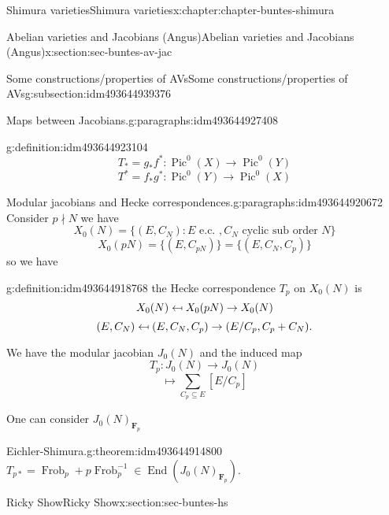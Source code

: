 \documentclass[oneside,10pt,]{book}
\numberwithin{equation}{section}
\newcommand{\inv}{^{-1}}
\providecommand\mapsfrom{\mathrel{\reflectbox{\ensuremath{\mapsto}}}}
\newcommand{\FF}{\mathbf{F}}
\DeclareMathOperator{\End}{End}
\DeclareMathOperator{\Pic}{Pic}
\DeclareMathOperator{\Frob}{Frob}
\begin{document}
\begin{chapterptx}{Shimura varieties}{}{Shimura varieties}{}{}{x:chapter:chapter-buntes-shimura}
\begin{sectionptx}{Abelian varieties and Jacobians (Angus)}{}{Abelian varieties and Jacobians (Angus)}{}{}{x:section:sec-buntes-av-jac}
\begin{subsectionptx}{Some constructions\slash{}properties of AVs}{}{Some constructions\slash{}properties of AVs}{}{}{g:subsection:idm493644939376}
\begin{paragraphs}{Maps between Jacobians.}{g:paragraphs:idm493644927408}
\begin{definition}{}{g:definition:idm493644923104}
\begin{equation*}
T_* = g_* f^* \colon \Pic^0(X) \to \Pic^0(Y)
\end{equation*}
%
\begin{equation*}
T^* = f_* g^* \colon \Pic^0(Y) \to \Pic^0(X)
\end{equation*}
%
\end{definition}
\end{paragraphs}%
\begin{paragraphs}{Modular jacobians and Hecke correspondences.}{g:paragraphs:idm493644920672}%
Consider \(p\nmid N\) we have%
\begin{equation*}
X_0(N) = \{ (E,C_N) : E\text{ e.c. }, C_N \text{ cyclic sub order } N\}
\end{equation*}
%
\begin{equation*}
X_0(pN) = \{(E,C_{pN})\} = \{(E,C_N,C_p)\}
\end{equation*}
so we have%
\begin{definition}{}{g:definition:idm493644918768}%
the Hecke correspondence \(T_p\) on \(X_0(N)\) is%
\begin{equation*}
X_0(N) \mapsfrom X_0(pN) \to X_0(N)
\end{equation*}
%
\begin{equation*}
(E,C_N)\mapsfrom (E,C_N,C_p)\to (E/C_p, C_p + C_N)\text{.}
\end{equation*}
%
\end{definition}
We have the modular jacobian \(J_0(N)\) and the induced map%
\begin{equation*}
T_p \colon J_0(N) \to J_0(N)
\end{equation*}
%
\begin{equation*}
[E] \mapsto \sum_{C_p \subseteq E} [E/C_p]
\end{equation*}
%
\par
One can consider \(J_0(N)_{\FF_p}\)%
\begin{theorem}{Eichler-Shimura.}{}{g:theorem:idm493644914800}%
\(T_{p*} = \Frob_p + p \Frob_p\inv \in \End(J_0(N)_{\FF_p})\).%
\end{theorem}
\end{paragraphs}%
\end{subsectionptx}
\end{sectionptx}
%
%
\typeout{************************************************}
\typeout{************************************************}
%
\begin{sectionptx}{Ricky Show}{}{Ricky Show}{}{}{x:section:sec-buntes-hs}
%
%
\typeout{************************************************}

\end{sectionptx}
\end{chapterptx}
\end{document}
